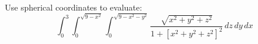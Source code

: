 Use spherical coordinates to evaluate:
\[\int_0^3 \int_0^{\sqrt{9 - x^2}} \int_0^{\sqrt{9 - x^2 - y^2}} \frac{\sqrt{x^2 + y^2 + z^2}}{1 + [x^2 + y^2 + z^2]^2}\, dz\, dy\, dx\]